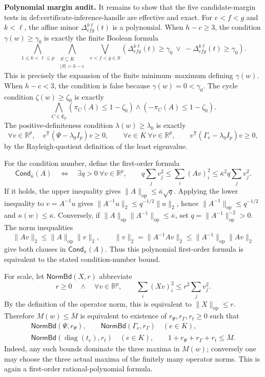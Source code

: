 \textbf{Polynomial margin audit.}
It remains to show that the five candidate-margin tests in \(\text{def:certificate-inference-handle}\) are effective and exact. For \(e<f<g\) and \(k<\ell\), the affine minor \(\Delta^{k\ell}_{efg}(t)\) is a polynomial. When \(h-c\geq3\), the condition \(\gamma(w)\geq\gamma_0\) is exactly the finite Boolean formula
\[
\bigwedge_{1\leq k<\ell\leq p}
\ \bigwedge_{\substack{S\subseteq K\\|S|=h-c}}
\ \bigvee_{e<f<g\in S}
\left(\Delta^{k\ell}_{efg}(t)\geq\gamma_0
\ \vee\ -\Delta^{k\ell}_{efg}(t)\geq\gamma_0\right).
\]
This is precisely the expansion of the finite minimum--maximum defining \(\gamma(w)\). When \(h-c<3\), the condition is false because \(\gamma(w)=0<\gamma_0\). The cycle condition \(\zeta(w)\geq\zeta_0\) is exactly
\[
\bigwedge_{C\in\mathfrak C_p}
\left(\pi_C(A)\leq1-\zeta_0\right)
\wedge
\left(-\pi_C(A)\leq1-\zeta_0\right).
\]
The positive-definiteness condition \(\lambda(w)\geq\lambda_0\) is exactly
\[
\forall v\in\mathbb R^p,\quad
v^{\mathsf T}(\Psi-\lambda_0I_p)v\geq0,
\qquad
\forall e\in K\ \forall v\in\mathbb R^p,\qquad
v^{\mathsf T}(\Gamma_e-\lambda_0I_p)v\geq0,
\]
by the Rayleigh-quotient definition of the least eigenvalue.

For the condition number, define the first-order formula
\[
\mathsf{Cond}_{\overline\kappa}(A)
\quad\Longleftrightarrow\quad
\exists q>0\ \forall v\in\mathbb R^p,\qquad
q\sum_jv_j^2\leq\sum_i(Av)_i^2
\leq\overline\kappa^2q\sum_jv_j^2.
\]
If it holds, the upper inequality gives \(\|A\|_{\mathrm{op}}\leq\overline\kappa\sqrt q\). Applying the lower inequality to \(v=A^{-1}u\) gives \(\|A^{-1}u\|_2\leq q^{-1/2}\|u\|_2\), hence \(\|A^{-1}\|_{\mathrm{op}}\leq q^{-1/2}\) and \(\kappa(w)\leq\overline\kappa\). Conversely, if \(\|A\|_{\mathrm{op}}\|A^{-1}\|_{\mathrm{op}}\leq\overline\kappa\), set \(q=\|A^{-1}\|_{\mathrm{op}}^{-2}>0\). The norm inequalities
\[
\|Av\|_2\leq\|A\|_{\mathrm{op}}\|v\|_2,
\qquad
\|v\|_2=\|A^{-1}Av\|_2\leq\|A^{-1}\|_{\mathrm{op}}\|Av\|_2
\]
give both clauses in \(\mathsf{Cond}_{\overline\kappa}(A)\). Thus this polynomial first-order formula is equivalent to the stated condition-number bound.

For scale, let \(\mathsf{NormBd}(X,r)\) abbreviate
\[
r\geq0\quad\wedge\quad
\forall v\in\mathbb R^p,\qquad
\sum_i(Xv)_i^2\leq r^2\sum_jv_j^2.
\]
By the definition of the operator norm, this is equivalent to \(\|X\|_{\mathrm{op}}\leq r\). Therefore \(M(w)\leq\overline M\) is equivalent to existence of \(r_\Psi,r_\Gamma,r_t\geq0\) such that
\[
\begin{gathered}
\mathsf{NormBd}(\Psi,r_\Psi),\qquad
\mathsf{NormBd}(\Gamma_e,r_\Gamma)\quad(e\in K),\\
\mathsf{NormBd}(\operatorname{diag}(t_e),r_t)\quad(e\in K),
\qquad
1+r_\Psi+r_\Gamma+r_t\leq\overline M.
\end{gathered}
\]
Indeed, any such bounds dominate the three maxima in \(M(w)\); conversely one may choose the three actual maxima of the finitely many operator norms. This is again a first-order rational-polynomial formula.


